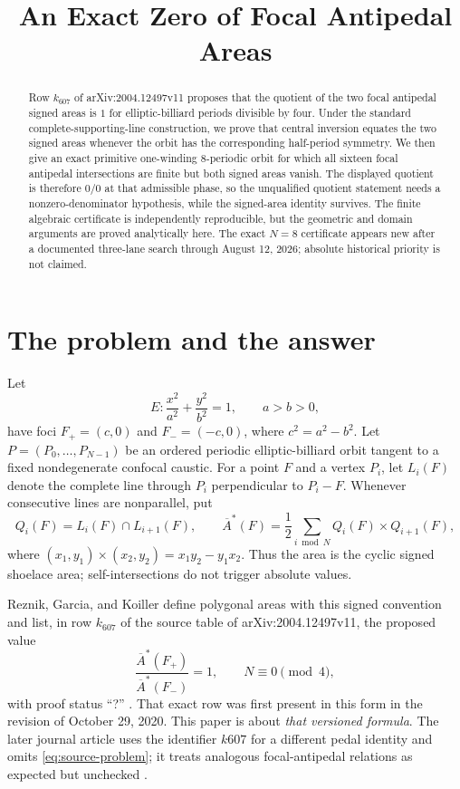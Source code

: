 \documentclass[11pt,a4paper]{amsart}
\title[An exact zero of focal antipedal areas]{An Exact Zero of Focal Antipedal Areas}
\date{}
\theoremstyle{definition}
\theoremstyle{remark}
\newcommand{\Abar}{\overline A}
\newcommand{\cross}{\mathbin{\times}}
\begin{document}
\begin{abstract}
Row $k_{607}$ of arXiv:2004.12497v11 proposes that the quotient of the two focal antipedal signed areas is $1$ for elliptic-billiard periods divisible by four.
Under the standard complete-supporting-line construction, we prove that central inversion equates the two signed areas whenever the orbit has the corresponding half-period symmetry.
We then give an exact primitive one-winding $8$-periodic orbit for which all sixteen focal antipedal intersections are finite but both signed areas vanish.
The displayed quotient is therefore $0/0$ at that admissible phase, so the unqualified quotient statement needs a nonzero-denominator hypothesis, while the signed-area identity survives.
The finite algebraic certificate is independently reproducible, but the geometric and domain arguments are proved analytically here.
The exact $N=8$ certificate appears new after a documented three-lane search through August 12, 2026; absolute historical priority is not claimed.
\end{abstract}

\maketitle
{}

\section{The problem and the answer}

Let
\[
 E:\frac{x^2}{a^2}+\frac{y^2}{b^2}=1,
 \qquad a>b>0,
\]
have foci $F_+=(c,0)$ and $F_-=(-c,0)$, where
$c^2=a^2-b^2$.  Let $P=(P_0,\ldots,P_{N-1})$ be an ordered periodic
elliptic-billiard orbit tangent to a fixed nondegenerate confocal caustic.
For a point $F$ and a vertex $P_i$, let $L_i(F)$ denote the complete line
through $P_i$ perpendicular to $P_i-F$.  Whenever consecutive lines are
nonparallel, put
\[
 Q_i(F)=L_i(F)\cap L_{i+1}(F),
 \qquad
 \Abar^*(F)=\frac12\sum_{i\bmod N}Q_i(F)\cross Q_{i+1}(F),
\]
where $(x_1,y_1)\cross(x_2,y_2)=x_1y_2-y_1x_2$.  Thus the area is the
cyclic signed shoelace area; self-intersections do not trigger absolute
values.

Reznik, Garcia, and Koiller define polygonal areas with this signed
convention and list, in row $k_{607}$ of the source table of
arXiv:2004.12497v11, the proposed value
\begin{equation}\label{eq:source-problem}
 \frac{\Abar^*(F_+)}{\Abar^*(F_-)}=1,
 \qquad N\equiv0\pmod 4,
\end{equation}
with proof status ``?'' \cite{ReznikGarciaKoiller2020v11}.  That exact row was
first present in this form in the revision of October 29, 2020.  This paper is
about \emph{that versioned formula}.  The later journal article uses the
identifier $k607$ for a different pedal identity and omits
\eqref{eq:source-problem}; it treats analogous focal-antipedal relations as
expected but unchecked \cite[Sec.~3.7 and Table~7]{ReznikGarciaKoiller2021}.
\end{document}
